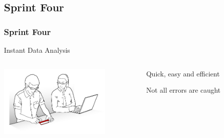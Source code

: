 \subsection{Sprint Four}
\begin{frame}
\frametitle{Sprint Four}
\begin{center}
Instant Data Analysis\\
\vspace{\baselineskip}
\begin{columns}
\begin{column}{0.5\textwidth}
\includegraphics[height=3.5cm]{images/usertest}
\end{column}
\begin{column}{0.5\textwidth}

\begin{description}
\item<1>[Strengths:] Quick, easy and efficient
\item<2>[Weaknesses:] Not all errors are caught
\end{description}

\end{column}
\end{columns}
\end{center}
\end{frame}


